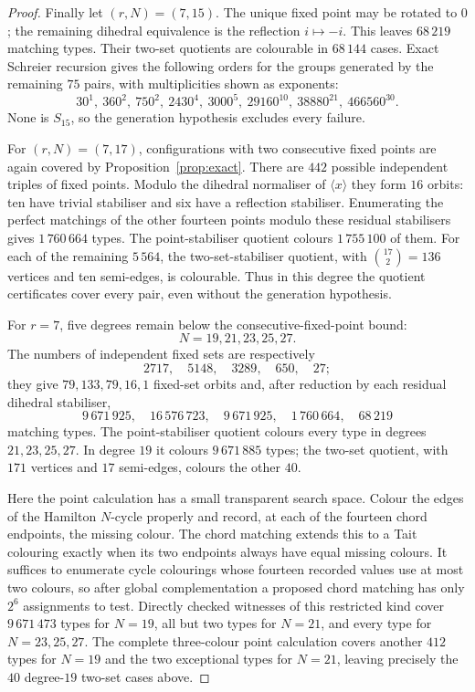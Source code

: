 \documentclass[11pt,a4paper]{article}
\theoremstyle{definition}
\theoremstyle{remark}
\begin{document}
\begin{proof}
Finally let $(r,N)=(7,15)$.  The unique fixed point may be rotated to $0$; the remaining dihedral equivalence is the reflection $i\mapsto-i$.  This leaves $68\,219$ matching types.  Their two-set quotients are colourable in $68\,144$ cases.  Exact Schreier recursion gives the following orders for the groups generated by the remaining $75$ pairs, with multiplicities shown as exponents:
\[
 30^1,\ 360^2,\ 750^2,\ 2430^4,\ 3000^5,\
 29160^{10},\ 38880^{21},\ 466560^{30}.
\]
None is $S_{15}$, so the generation hypothesis excludes every failure.

For $(r,N)=(7,17)$, configurations with two consecutive fixed points are again covered by Proposition~\ref{prop:exact}.  There are $442$ possible independent triples of fixed points.  Modulo the dihedral normaliser of $\langle x\rangle$ they form $16$ orbits: ten have trivial stabiliser and six have a reflection stabiliser.  Enumerating the perfect matchings of the other fourteen points modulo these residual stabilisers gives $1\,760\,664$ types.  The point-stabiliser quotient colours $1\,755\,100$ of them.  For each of the remaining $5\,564$, the two-set-stabiliser quotient, with $\binom{17}{2}=136$ vertices and ten semi-edges, is colourable.  Thus in this degree the quotient certificates cover every pair, even without the generation hypothesis.

For $r=7$, five degrees remain below the consecutive-fixed-point bound:
\[
 N=19,21,23,25,27.
\]
The numbers of independent fixed sets are respectively
\[
 2717,\quad5148,\quad3289,\quad650,\quad27;
\]
they give $79,133,79,16,1$ fixed-set orbits and, after reduction by each residual dihedral stabiliser,
\[
 9\,671\,925,\quad16\,576\,723,\quad9\,671\,925,
 \quad1\,760\,664,\quad68\,219
\]
matching types.  The point-stabiliser quotient colours every type in degrees $21,23,25,27$.  In degree $19$ it colours $9\,671\,885$ types; the two-set quotient, with $171$ vertices and $17$ semi-edges, colours the other $40$.

Here the point calculation has a small transparent search space.  Colour the edges of the Hamilton $N$-cycle properly and record, at each of the fourteen chord endpoints, the missing colour.  The chord matching extends this to a Tait colouring exactly when its two endpoints always have equal missing colours.  It suffices to enumerate cycle colourings whose fourteen recorded values use at most two colours, so after global complementation a proposed chord matching has only $2^6$ assignments to test.  Directly checked witnesses of this restricted kind cover $9\,671\,473$ types for $N=19$, all but two types for $N=21$, and every type for $N=23,25,27$.  The complete three-colour point calculation covers another $412$ types for $N=19$ and the two exceptional types for $N=21$, leaving precisely the $40$ degree-$19$ two-set cases above.


\end{proof}
\end{document}
